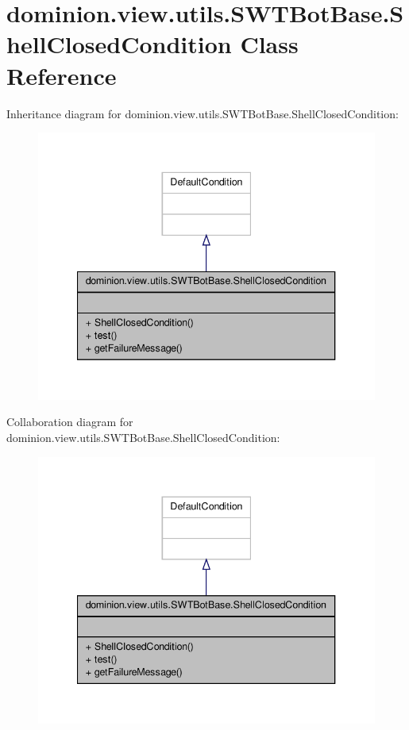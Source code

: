 \hypertarget{classdominion_1_1view_1_1utils_1_1SWTBotBase_1_1ShellClosedCondition}{\section{dominion.\-view.\-utils.\-S\-W\-T\-Bot\-Base.\-Shell\-Closed\-Condition \-Class \-Reference}
\label{classdominion_1_1view_1_1utils_1_1SWTBotBase_1_1ShellClosedCondition}
}


\-Inheritance diagram for dominion.\-view.\-utils.\-S\-W\-T\-Bot\-Base.\-Shell\-Closed\-Condition\-:
\nopagebreak
\begin{figure}[H]
\begin{center}
\leavevmode
\includegraphics[width=340pt]{classdominion_1_1view_1_1utils_1_1SWTBotBase_1_1ShellClosedCondition__inherit__graph}
\end{center}
\end{figure}


\-Collaboration diagram for dominion.\-view.\-utils.\-S\-W\-T\-Bot\-Base.\-Shell\-Closed\-Condition\-:
\nopagebreak
\begin{figure}[H]
\begin{center}
\leavevmode
\includegraphics[width=340pt]{classdominion_1_1view_1_1utils_1_1SWTBotBase_1_1ShellClosedCondition__coll__graph}
\end{center}
\end{figure}

